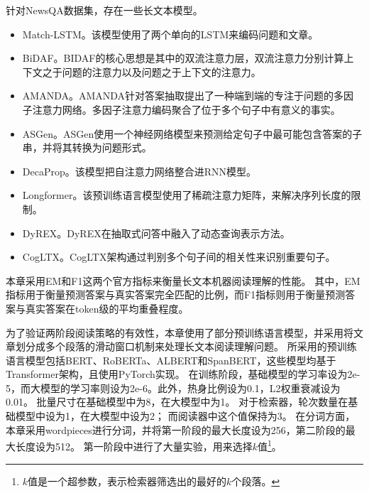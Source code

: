 针对NewsQA数据集，存在一些长文本模型。
\begin{itemize}
    \item Match-LSTM\cite{wang2015learning}。该模型使用了两个单向的LSTM来编码问题和文章。
    \item BiDAF\cite{seo2016bidirectional}。BIDAF的核心思想是其中的双流注意力层，双流注意力分别计算上下文之于问题的注意力以及问题之于上下文的注意力。
    \item AMANDA\cite{kundu2018question}。AMANDA针对答案抽取提出了一种端到端的专注于问题的多因子注意力网络。多因子注意力编码聚合了位于多个句子中有意义的事实。
    \item ASGen\cite{Back2021LearningTG}。ASGen使用一个神经网络模型来预测给定句子中最可能包含答案的子串，并将其转换为问题形式。
    \item DecaProp\cite{tay2018densely}。该模型把自注意力网络整合进RNN模\cite{mikolov2010recurrent}型。
    \item Longformer\cite{beltagy2020longformer}。该预训练语言模型使用了稀疏注意力矩阵，来解决序列长度的限制。
    \item DyREX\cite{Zaratiana2022DyRExDQ}。DyREX在抽取式问答中融入了动态查询表示方法。
    \item CogLTX\cite{ding2020cogltx}。CogLTX架构通过判别多个句子间的相关性来识别重要句子。
\end{itemize}

本章采用EM和F1这两个官方指标来衡量长文本机器阅读理解的性能。
其中，EM指标用于衡量预测答案与真实答案完全匹配的比例，而F1指标则用于衡量预测答案与真实答案在token级的平均重叠程度。

为了验证两阶段阅读策略的有效性，本章使用了部分预训练语言模型，并采用将文章划分成多个段落的滑动窗口机制来处理长文本阅读理解问题。
所采用的预训练语言模型包括BERT\cite{devlin2018bert}、RoBERTa\cite{liu2019roberta}、ALBERT\cite{lan2019albert}和SpanBERT\cite{joshi2020spanbert}，这些模型均基于Transformer\cite{vaswani2017attention}架构，且使用PyTorch实现。
在训练阶段，基础模型的学习率设为2e-5，而大模型的学习率则设为2e-6。此外，热身比例设为0.1，L2权重衰减设为0.01。
批量尺寸在基础模型中为8，在大模型中为1。
对于检索器，轮次数量在基础模型中设为1，在大模型中设为2；
而阅读器中这个值保持为3。
在分词方面，本章采用wordpieces\cite{wu2016google}进行分词，并将第一阶段的最大长度设为256，第二阶段的最大长度设为512。
第一阶段中进行了大量实验，用来选择$k$值\footnote{$k$值是一个超参数，表示检索器筛选出的最好的$k$个段落。}。



